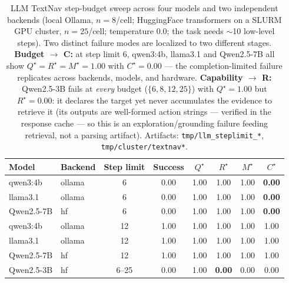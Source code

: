\documentclass{article}
\begin{document}
\begin{table}[h]
  \caption{LLM TextNav step-budget sweep across four models and two independent backends (local Ollama, $n{=}8$/cell; HuggingFace transformers on a SLURM GPU cluster, $n{=}25$/cell; temperature 0.0; the task needs $\sim$10 low-level steps). Two distinct failure modes are localized to two different stages. \textbf{Budget $\to$ C:} at step limit 6, qwen3:4b, llama3.1 and Qwen2.5-7B all show $Q^\star{=}R^\star{=}M^\star{=}1.00$ with $C^\star{=}0.00$ --- the completion-limited failure replicates across backends, models, and hardware. \textbf{Capability $\to$ R:} Qwen2.5-3B fails at \emph{every} budget ($\{6,8,12,25\}$) with $Q^\star{=}1.00$ but $R^\star{=}0.00$: it declares the target yet never accumulates the evidence to retrieve it (its outputs are well-formed action strings --- verified in the response cache --- so this is an exploration/grounding failure feeding retrieval, not a parsing artifact). Artifacts: \texttt{tmp/llm\_steplimit\_*}, \texttt{tmp/cluster/textnav*}.}
  \label{tab:llm-smoke}
  \centering
  \small
  \begin{tabular}{l l c c c c c c}
    \toprule
    Model & Backend & Step limit & Success & $Q^\star$ & $R^\star$ & $M^\star$ & $C^\star$ \\
    \midrule
    qwen3:4b        & ollama & 6  & 0.00 & 1.00 & 1.00 & 1.00 & \textbf{0.00} \\
    llama3.1        & ollama & 6  & 0.00 & 1.00 & 1.00 & 1.00 & \textbf{0.00} \\
    Qwen2.5-7B      & hf     & 6  & 0.00 & 1.00 & 1.00 & 1.00 & \textbf{0.00} \\
    \midrule
    qwen3:4b        & ollama & 12 & 1.00 & 1.00 & 1.00 & 1.00 & 1.00 \\
    llama3.1        & ollama & 12 & 1.00 & 1.00 & 1.00 & 1.00 & 1.00 \\
    Qwen2.5-7B      & hf     & 12 & 1.00 & 1.00 & 1.00 & 1.00 & 1.00 \\
    \midrule
    Qwen2.5-3B      & hf     & 6--25 & 0.00 & 1.00 & \textbf{0.00} & 0.00 & 0.00 \\
    \bottomrule
  \end{tabular}
\end{table}
\end{document}
